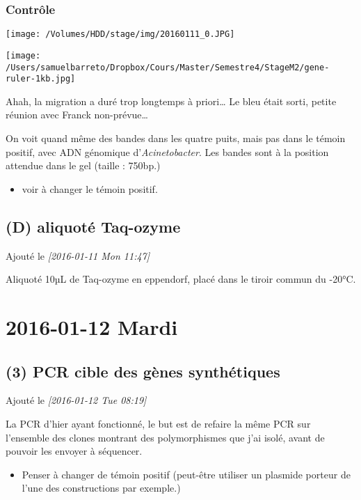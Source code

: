 \documentclass[9pt, oneside, twocolumn]{scrartcl}
\begin{document}
\subsubsection{Contrôle}
\label{sec:orgheadline3}
\texttt{[image: /Volumes/HDD/stage/img/20160111\_0.JPG]}

\texttt{[image: /Users/samuelbarreto/Dropbox/Cours/Master/Semestre4/StageM2/gene-ruler-1kb.jpg]}

Ahah, la migration a duré trop longtemps à priori… Le bleu était sorti, petite
réunion avec Franck non-prévue…

On voit quand même des bandes dans les quatre puits, mais pas dans le témoin
positif, avec ADN génomique d'\emph{Acinetobacter}. Les bandes sont à la position
attendue dans le gel (taille : 750bp.) 

\begin{itemize}
\item voir à changer le témoin positif.
\end{itemize}

\subsection{(D) aliquoté Taq-ozyme}
\label{sec:orgheadline5}
Ajouté le \textit{[2016-01-11 Mon 11:47]}

Aliquoté 10µL de Taq-ozyme en eppendorf, placé dans le tiroir commun du -20°C.

\section{2016-01-12 Mardi}
\label{sec:orgheadline18}
\subsection{(3) PCR cible des gènes synthétiques}
\label{sec:orgheadline10}
Ajouté le \textit{[2016-01-12 Tue 08:19]}

La PCR d'hier ayant fonctionné, le but est de refaire la même PCR sur l'ensemble
des clones montrant des polymorphismes que j'ai isolé, avant de pouvoir les
envoyer à séquencer.

\begin{itemize}
\item Penser à changer de témoin positif (peut-être utiliser un plasmide porteur de
l'une des constructions par exemple.)
\end{itemize}
\end{document}
